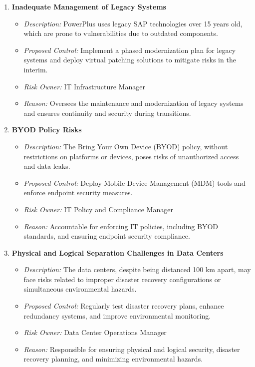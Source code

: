 \begin{enumerate}
    \item \textbf{Inadequate Management of Legacy Systems}
    \begin{itemize}
        \item \textit{Description:} PowerPlus uses legacy SAP technologies over 15 years old, which are prone to vulnerabilities due to outdated components.
        \item \textit{Proposed Control:} Implement a phased modernization plan for legacy systems and deploy virtual patching solutions to mitigate risks in the interim.
        \item \textit{Risk Owner:} IT Infrastructure Manager
        \item \textit{Reason:} Oversees the maintenance and modernization of legacy systems and ensures continuity and security during transitions.
    \end{itemize}

    \item \textbf{BYOD Policy Risks}
    \begin{itemize}
        \item \textit{Description:} The Bring Your Own Device (BYOD) policy, without restrictions on platforms or devices, poses risks of unauthorized access and data leaks.
        \item \textit{Proposed Control:} Deploy Mobile Device Management (MDM) tools and enforce endpoint security measures.
        \item \textit{Risk Owner:} IT Policy and Compliance Manager
        \item \textit{Reason:} Accountable for enforcing IT policies, including BYOD standards, and ensuring endpoint security compliance.
    \end{itemize}

    \item \textbf{Physical and Logical Separation Challenges in Data Centers}
    \begin{itemize}
        \item \textit{Description:} The data centers, despite being distanced 100 km apart, may face risks related to improper disaster recovery configurations or simultaneous environmental hazards.
        \item \textit{Proposed Control:} Regularly test disaster recovery plans, enhance redundancy systems, and improve environmental monitoring.
        \item \textit{Risk Owner:} Data Center Operations Manager
        \item \textit{Reason:} Responsible for ensuring physical and logical security, disaster recovery planning, and minimizing environmental hazards.
    \end{itemize}


\end{enumerate}
